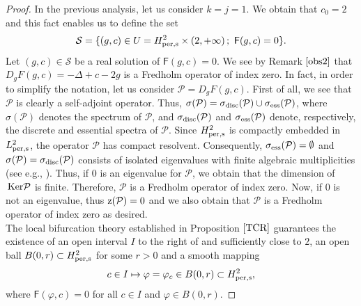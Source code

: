 \documentclass[12pt,reqno,a4paper]{amsart} %
\newcommand{\Ker}{{\rm \,Ker}}
\numberwithin{equation}{section}
\numberwithin{figure}{section}
\begin{document}
\begin{proof}
				In the previous analysis, let us consider $k=j=1$. We obtain that $c_0=2$ and this fact enables us to define the set $$\mathcal{S} = \{(g, c) \in U=H_{\rm per,s}^2\times \left(2,+\infty\right);\ \mathsf{F}(g, c) = 0\}.$$ 
			 Let $(g, c) \in \mathcal{S}$ be a real solution of $\mathsf{F}(g, c) = 0$. We see by Remark $\ref{obs2}$ that
			 $D_gF(g,c)=-\Delta+c-2g$ is a Fredholm operator of index zero. In fact, in order to simplify the notation, let us consider $\mathcal{P}=D_gF(g,c)$. First of all, we see that $\mathcal{P}$ is clearly a self-adjoint operator. Thus,
			 $\sigma(\mathcal{P})=\sigma_{\rm disc}(\mathcal{P})\cup \sigma_{\rm ess}(\mathcal{P})$,  where $\sigma(\mathcal{P})$
			 denotes the spectrum of  $\mathcal{P}$, and  $\sigma_{\rm disc}(\mathcal{P})$ and $\sigma_{\rm ess}(\mathcal{P})$
			 denote, respectively, the discrete and essential spectra of  $\mathcal{P}$. Since $H^2_{\rm per,s}$
			 is compactly embedded in $L^2_{\rm per,s}$, the operator $\mathcal{P}$ has compact resolvent.
			 Consequently, $\sigma_{\rm ess}(\mathcal{P})=\emptyset$ and $\sigma(\mathcal{P})=\sigma_{\rm disc}(\mathcal{P})$ consists
			 of isolated eigenvalues with finite algebraic multiplicities (see e.g., \cite[Section III.6]{kato}). Thus, if $0$ is an eigenvalue for $\mathcal{P}$, we obtain that the dimension of 
			 $\Ker\mathcal{P}$ is finite. Therefore, $\mathcal{P}$ is a Fredholm operator of index zero. Now, if $0$ is not an eigenvalue, thus ${\rm z}(\mathcal{P})=0$ and we also obtain that $\mathcal{P}$ is a Fredholm operator of index zero as desired. \\
			 \indent The local bifurcation theory established in Proposition $\ref{TCR}$ guarantees the existence of an open interval $I$ to the right of and sufficiently close to $2$, an open ball $B(0,r) \subset H_{\rm per,s}^{2}$ for some $r>0$ and a  smooth mapping
			 \begin{equation}\label{localcurve}c \in I \mapsto \varphi= \varphi_c \in B(0,r) \subset H_{\rm per,s}^{2},\end{equation}
			 where $\mathsf{F}(\varphi,c) = 0$ for all $c \in I$ and $\varphi\in B(0,r)$.
			 

\end{proof}
\end{document}
